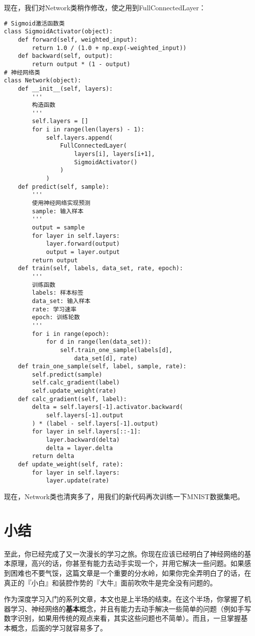 现在，我们对Network类稍作修改，使之用到FullConnectedLayer：
\begin{lstlisting}
# Sigmoid激活函数类
class SigmoidActivator(object):
    def forward(self, weighted_input):
        return 1.0 / (1.0 + np.exp(-weighted_input))
    def backward(self, output):
        return output * (1 - output)
# 神经网络类
class Network(object):
    def __init__(self, layers):
        '''
        构造函数
        '''
        self.layers = []
        for i in range(len(layers) - 1):
            self.layers.append(
                FullConnectedLayer(
                    layers[i], layers[i+1],
                    SigmoidActivator()
                )
            )
    def predict(self, sample):
        '''
        使用神经网络实现预测
        sample: 输入样本
        '''
        output = sample
        for layer in self.layers:
            layer.forward(output)
            output = layer.output
        return output
    def train(self, labels, data_set, rate, epoch):
        '''
        训练函数
        labels: 样本标签
        data_set: 输入样本
        rate: 学习速率
        epoch: 训练轮数
        '''
        for i in range(epoch):
            for d in range(len(data_set)):
                self.train_one_sample(labels[d], 
                    data_set[d], rate)
    def train_one_sample(self, label, sample, rate):
        self.predict(sample)
        self.calc_gradient(label)
        self.update_weight(rate)
    def calc_gradient(self, label):
        delta = self.layers[-1].activator.backward(
            self.layers[-1].output
        ) * (label - self.layers[-1].output)
        for layer in self.layers[::-1]:
            layer.backward(delta)
            delta = layer.delta
        return delta
    def update_weight(self, rate):
        for layer in self.layers:
            layer.update(rate)
\end{lstlisting}

现在，Network类也清爽多了，用我们的新代码再次训练一下MNIST数据集吧。

\section{小结}

至此，你已经完成了又一次漫长的学习之旅。你现在应该已经明白了神经网络的基本原理，高兴的话，你甚至有能力去动手实现一个，并用它解决一些问题。如果感到困难也不要气馁，这篇文章是一个重要的分水岭，如果你完全弄明白了的话，在真正的『小白』和装腔作势的『大牛』面前吹吹牛是完全没有问题的。

作为深度学习入门的系列文章，本文也是上半场的结束。在这个半场，你掌握了机器学习、神经网络的\textbf{基本}概念，并且有能力去动手解决一些简单的问题（例如手写数字识别，如果用传统的观点来看，其实这些问题也不简单）。而且，一旦掌握基本概念，后面的学习就容易多了。

